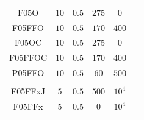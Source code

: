 \documentclass[submission,phys]{lib/SciPost}
\begin{document}
\begin{table}
\begin{tabular}{c c c c c c}
           F05O   & $10$ & $0.5$ & $275$ & $0$ \\
           F05FFO & $10$ & $0.5$ & $170$ & $400$ & \\
           F05OC   & $10$ & $0.5$ & $275$ & $0$ \\
           F05FFOC & $10$ & $0.5$ & $170$ & $400$ & \\
           P05FFO   & $10$ & $0.5$ & $60$  & $500$ \\
           \hline
           \hline \vspace{-0.75em}\\
           F05FFxJ & $5$ & $0.5$ & $500$ & $10^{4}$ \\
           F05FFx  & $5$ & $0.5$ & $0$   & $10^{4}$\\
         \hline                                   %
        \end{tabular}
     \end{table}
\end{document}
